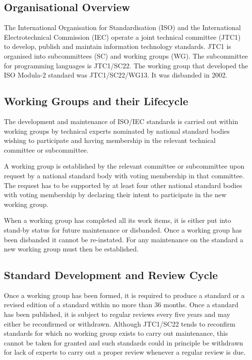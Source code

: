 \documentclass[10pt,a4paper,leqno,fleqn]{article}
\begin{document}
\subsection{Organisational Overview}
The International Organisation for Standardisation (ISO) and the International
Electrotechnical Commission (IEC) operate a joint technical committee (JTC1)
to develop, publish and maintain information technology standards. JTC1 is
organised into subcommittees (SC) and working groups (WG). The subcommittee
for programming languages is JTC1/SC22. The working group that developed the
ISO Modula-2 standard was JTC1/SC22/WG13. It was disbanded in 2002.

\subsection{Working Groups and their Lifecycle}
The development and maintenance of ISO/IEC standards is carried out within
working groups by technical experts nominated by national standard bodies
wishing to participate and having membership in the relevant technical committee
or subcommittee.

A working group is established by the relevant committee or subcommittee upon
request by a national standard body with voting membership in that
committee. The request has to be supported by at least four other national standard bodies
with voting membership by declaring their intent to participate in the new working group.

When a working group has completed all its work items, it is either put into stand-by
status for future maintenance or disbanded. Once a working group has been disbanded
it cannot be re-instated. For any maintenance on the standard a new working group
must then be established.

\subsection{Standard Development and Review Cycle}
Once a working group has been formed, it is required to produce a standard
or a revised edition of a standard within no more than 36 months. Once a
standard has been published, it is subject to regular reviews every five years
and may either be reconfirmed or withdrawn. Although JTC1/SC22 tends to
reconfirm standards for which no working group exists to carry out
maintenance, this cannot be taken for granted and such standards could in
principle be withdrawn for lack of experts to carry out a proper review
whenever a regular review is due.
\end{document}
